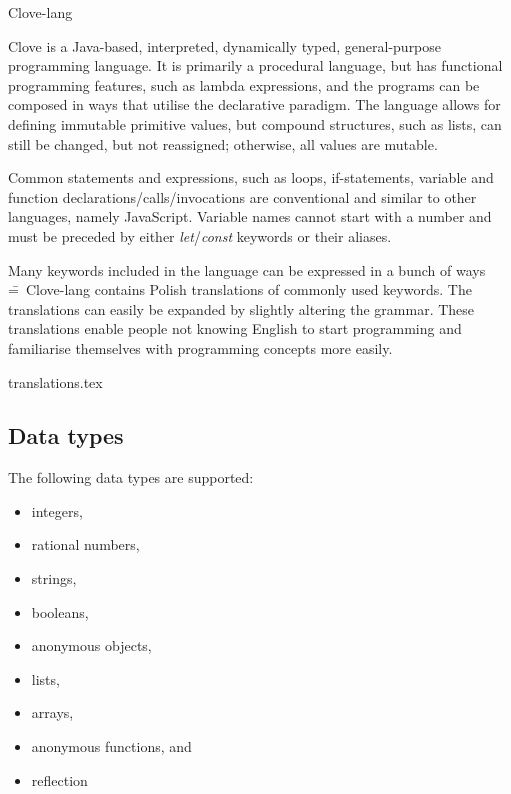 \documentclass[12pt,a4paper]{article}
\begin{document}
\begin{center}
  \Huge {Clove-lang}
\end{center}

\noindent Clove is a Java-based, interpreted, dynamically typed, general-purpose programming language. It is primarily a procedural language, but has functional programming features, such as lambda expressions, and the programs can be composed in ways that utilise the declarative paradigm. The language allows for defining immutable primitive values, but compound structures, such as lists, can still be changed, but not reassigned; otherwise, all values are mutable.\par

Common statements and expressions, such as loops, if-statements, variable and function declarations/calls/invocations are conventional and similar to other languages, namely JavaScript. Variable names cannot start with a number and must be preceded by either \emph{let}/\emph{const} keywords or their aliases.\par

Many keywords included in the language can be expressed in a bunch of ways \==~Clove-lang contains Polish translations of commonly used keywords. The translations can easily be expanded by slightly altering the grammar. These translations enable people not knowing English to start programming and familiarise themselves with programming concepts more easily.

{translations.tex}



\vspace{-1.75em}
\subsection*{Data types}
The following data types are supported:

\vspace{-0.5em}
\begin{itemize}
  \itemsep-0.25em
  \item integers,
  \item rational numbers,
  \item strings,
  \item booleans,
  \item anonymous objects,
  \item lists,
  \item arrays,
  \item anonymous functions, and
  \item reflection
\end{itemize}
\end{document}
